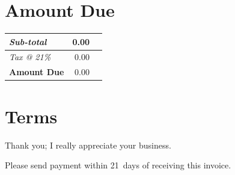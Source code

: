 \documentclass[a4paper,table]{article}
\begin{document}
\section*{Amount Due}
\label{sec:orgheadline2}

\hfill\colorbox{prlp-gray96}{\begin{minipage}{7.5cm}
\begin{center}
\begin{tabu}{Xrl}
\emph{Sub-total} & 0.00 & \texteuro{}\\
\hline
\emph{Tax @ 21\%} & 0.00 & \texteuro{}\\
\hline
\textbf{Amount Due} & 0.00 & \textbf{\texteuro{}}\\
\end{tabu}
\end{center}

\end{minipage}}

\section*{Terms}
\label{sec:orgheadline3}

Thank you; I really appreciate your business.

Please send payment within 21~days of receiving this invoice.

\vfill
\end{document}
